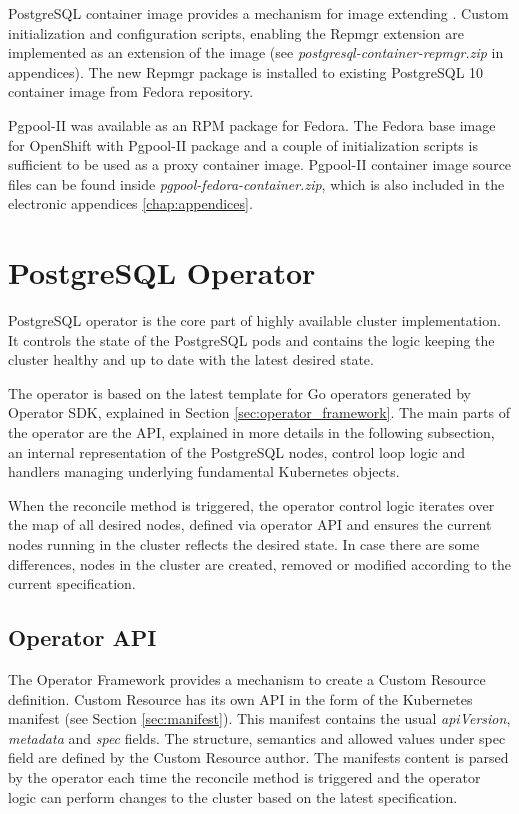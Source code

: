 \documentclass[
  digital, %
  twoside, %
  table,   %
  nolof,   %
  nolot,   %
]{fithesis3}
\begin{document}
PostgreSQL container image provides a mechanism for image extending \cite{pg_cnt_extending}. Custom initialization and configuration scripts, enabling the Repmgr extension are implemented as an extension of the image (see \textit{postgresql-container-repmgr.zip} in appendices). The new Repmgr package is installed to existing PostgreSQL 10 container image from Fedora repository.

Pgpool-II was available as an RPM package for Fedora. The Fedora base image for OpenShift with Pgpool-II package and  a couple of initialization scripts is sufficient to be used as a proxy container image. Pgpool-II container image source files can be found inside \textit{pgpool-fedora-container.zip}, which is also included in the electronic appendices \ref{chap:appendices}.

\section{PostgreSQL Operator}
PostgreSQL operator is the core part of highly available cluster implementation. It controls the state of the PostgreSQL pods and contains the logic keeping the cluster healthy and up to date with the latest desired state.

The operator is based on the latest template for Go operators generated by Operator SDK, explained in Section \ref{sec:operator_framework}. The main parts of the operator are the API, explained in more details in the following subsection, an internal representation of the PostgreSQL nodes, control loop logic and handlers managing underlying fundamental Kubernetes objects.

When the reconcile method is triggered, the operator control logic iterates over the map of all desired nodes, defined via operator API and ensures the current nodes running in the cluster reflects the desired state. In case there are some differences, nodes in the cluster are created, removed or modified according to the current specification.

\subsection{Operator API} \label{sec:operator_api}
The Operator Framework provides a mechanism to create a Custom Resource definition. Custom Resource has its own API in the form of the Kubernetes manifest (see Section \ref{sec:manifest}). This manifest contains the usual \textit{apiVersion}, \textit{metadata} and \textit{spec} fields. The structure, semantics and allowed values under spec field are defined by the Custom Resource author. The manifests content is parsed by the operator each time the reconcile method is triggered and the operator logic can perform changes to the cluster based on the latest specification.
\end{document}
